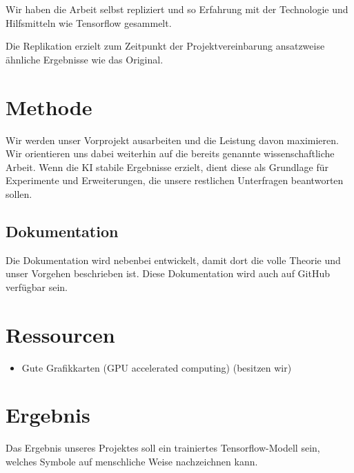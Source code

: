 \documentclass{article}
\begin{document}
Wir haben die Arbeit selbst repliziert und so Erfahrung mit der Technologie und
Hilfsmitteln wie Tensorflow gesammelt.

Die Replikation erzielt zum Zeitpunkt der Projektvereinbarung ansatzweise
ähnliche Ergebnisse wie das Original. 


\section{Methode}
\label{chap:methode}

Wir werden unser Vorprojekt ausarbeiten und die Leistung davon maximieren. Wir
orientieren uns dabei weiterhin auf die bereits genannte wissenschaftliche
Arbeit. Wenn die KI stabile Ergebnisse erzielt, dient diese als Grundlage für
Experimente und Erweiterungen, die unsere restlichen Unterfragen beantworten
sollen. 


\subsection{Dokumentation}
\label{chap:m_dokumentation}
Die Dokumentation wird nebenbei entwickelt, damit dort die volle Theorie
und unser Vorgehen beschrieben ist. Diese Dokumentation wird auch auf GitHub
verfügbar sein. 



\section{Ressourcen}
\label{chap:ressourcen}

\begin{itemize}
    \item Gute Grafikkarten (GPU accelerated computing) (besitzen wir)
\end{itemize}


\section{Ergebnis}
\label{chap:ergebnis}
Das Ergebnis unseres Projektes soll ein trainiertes Tensorflow-Modell sein,
welches Symbole auf menschliche Weise nachzeichnen kann.
\end{document}
